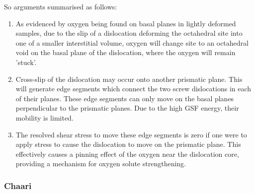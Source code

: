 \documentclass[a4paper,11pt]{article}
\numberwithin{equation}{chapter}
\numberwithin{listing}{chapter}
\begin{document}
So arguments summarised as follows:
\begin{enumerate}
\item As evidenced by oxygen being found on basal planes in lightly
deformed samples, due to the slip of a dislocation deforming the
octahedral site into one of a smaller interstitial volume,
oxygen will change site to an octahedral void on the basal plane
of the dislocation, where the oxygen will remain 'stuck'.
\item Cross-slip of the dislocation may occur onto another prismatic
plane. This will generate edge segments which connect the two
screw dislocations in each of their planes. These edge segments
can only move on the basal planes perpendicular to the prismatic
planes. Due to the high GSF energy, their mobility is limited.
\item The resolved shear stress to move these edge segments is zero if
one were to apply stress to cause the dislocation to move on the
prismatic plane. This effectively causes a pinning effect of the
oxygen near the dislocation core, providing a mechanism for
oxygen solute strengthening.
\end{enumerate}

\subsubsection{Chaari}
\label{sec:org3935723}
\end{document}
